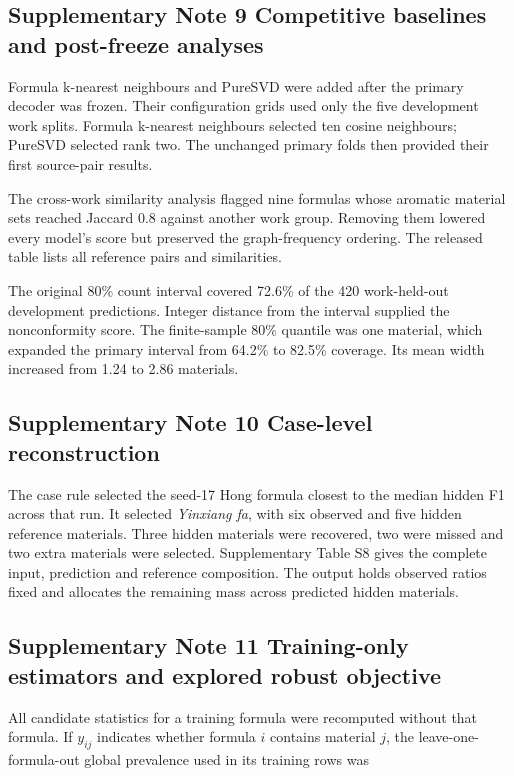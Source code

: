 \documentclass[11pt]{article}
\begin{document}
\subsection{Supplementary Note 9 Competitive baselines and post-freeze analyses}

Formula k-nearest neighbours and PureSVD were added after the primary decoder was frozen. Their configuration grids used only the five development work splits. Formula k-nearest neighbours selected ten cosine neighbours; PureSVD selected rank two. The unchanged primary folds then provided their first source-pair results.

The cross-work similarity analysis flagged nine formulas whose aromatic material sets reached Jaccard 0.8 against another work group. Removing them lowered every model's score but preserved the graph-frequency ordering. The released table lists all reference pairs and similarities.

The original 80\% count interval covered 72.6\% of the 420 work-held-out development predictions. Integer distance from the interval supplied the nonconformity score. The finite-sample 80\% quantile was one material, which expanded the primary interval from 64.2\% to 82.5\% coverage. Its mean width increased from 1.24 to 2.86 materials.

\subsection{Supplementary Note 10 Case-level reconstruction}

The case rule selected the seed-17 Hong formula closest to the median hidden F1 across that run. It selected \emph{Yinxiang fa}, with six observed and five hidden reference materials. Three hidden materials were recovered, two were missed and two extra materials were selected. Supplementary Table S8 gives the complete input, prediction and reference composition. The output holds observed ratios fixed and allocates the remaining mass across predicted hidden materials.

\subsection{Supplementary Note 11 Training-only estimators and explored robust objective}

All candidate statistics for a training formula were recomputed without that formula. If \(y_{ij}\) indicates whether formula \(i\) contains material \(j\), the leave-one-formula-out global prevalence used in its training rows was
\end{document}

